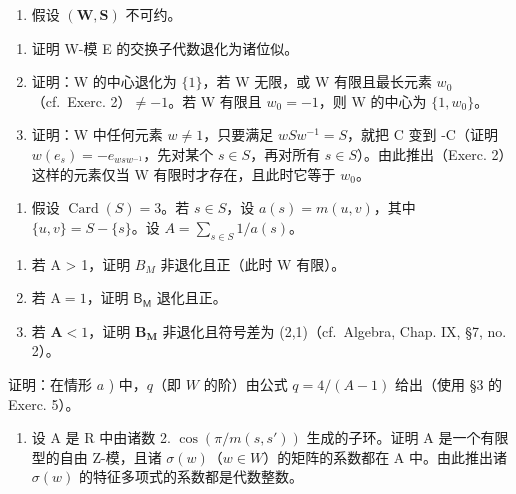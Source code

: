 \begin{enumerate}
\def\labelenumi{\arabic{enumi})}
\setcounter{enumi}{2}
\tightlist
\item
  假设 \((\mathbf{W},\mathbf{S})\) 不可约。
\end{enumerate}

\begin{enumerate}
\def\labelenumi{\alph{enumi})}
\item
  证明 W-模 E 的交换子代数退化为诸位似。
\item
  证明：W 的中心退化为 \(\{1\}\)，若 W 无限，或 W 有限且最长元素 \(w_{0}\)（cf.~Exerc. 2）\(\neq -1\)。若 W 有限且 \(w_{0} = -1\)，则 W 的中心为 \(\{1, w_{0}\}\)。
\item
  证明：W 中任何元素 \(w \neq 1\)，只要满足 \(wSw^{-1} = S\)，就把 C 变到 -C（证明 \(w(e_s) = -e_{wsw^{-1}}\)，先对某个 \(s \in S\)，再对所有 \(s \in S\)）。由此推出（Exerc. 2）这样的元素仅当 W 有限时才存在，且此时它等于 \(w_0\)。
\end{enumerate}

\begin{enumerate}
\def\labelenumi{\arabic{enumi})}
\setcounter{enumi}{3}
\tightlist
\item
  假设 \(\operatorname{Card}(S) = 3\)。若 \(s \in S\)，设 \(a(s) = m(u, v)\)，其中 \(\{u, v\} = S - \{s\}\)。设 \(A = \sum_{s \in S} 1 / a(s)\)。
\end{enumerate}

\begin{enumerate}
\def\labelenumi{\alph{enumi})}
\item
  若 A \textgreater{} 1，证明 \(B_{M}\) 非退化且正（此时 W 有限）。
\item
  若 \(\mathrm{A} = 1\)，证明 \(\mathsf{B}_{\mathsf{M}}\) 退化且正。
\item
  若 \(\mathbf{A} < 1\)，证明 \(\mathbf{B}_{\mathbf{M}}\) 非退化且符号差为 (2,1)（cf.~Algebra, Chap. IX, §7, no. 2）。
\end{enumerate}

证明：在情形 \(a\) ) 中，\(q\)（即 \(W\) 的阶）由公式 \(q = 4 / (A - 1)\) 给出（使用 §3 的 Exerc. 5）。

\begin{enumerate}
\def\labelenumi{\arabic{enumi})}
\setcounter{enumi}{4}
\tightlist
\item
  设 A 是 R 中由诸数 2. \(\cos(\pi/m(s, s'))\) 生成的子环。证明 A 是一个有限型的自由 Z-模，且诸 \(\sigma(w)\)（\(w \in W\)）的矩阵的系数都在 A 中。由此推出诸 \(\sigma(w)\) 的特征多项式的系数都是代数整数。
\end{enumerate}

